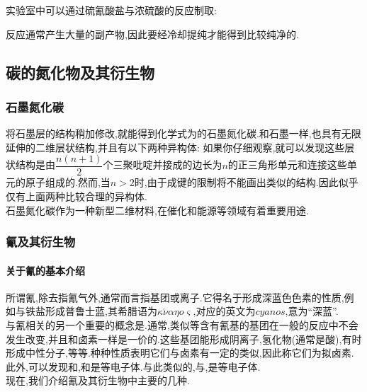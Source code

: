 \documentclass[draft]{ctexart}
\begin{document}
\indent 实验室中可以通过硫氰酸盐与浓硫酸的反应制取:
\begin{center}
\end{center}
反应通常产生大量的副产物,因此要经冷却提纯才能得到比较纯净的.
\subsection{碳的氮化物及其衍生物}
\subsubsection{石墨氮化碳}
将石墨层的结构稍加修改,就能得到化学式为的石墨氮化碳.和石墨一样,也具有无限延伸的二维层状结构,并且有以下两种异构体:
如果你仔细观察,就可以发现这些层状结构是由$\dfrac{n(n+1)}{2}$个三聚吡啶并接成的边长为$n$的正三角形单元和连接这些单元的原子组成的.然而,当$n>2$时,由于成键的限制将不能画出类似的结构.因此似乎仅有上面两种比较合理的异构体.\\
\indent 石墨氮化碳作为一种新型二维材料,在催化和能源等领域有着重要用途.
\subsubsection{氰及其衍生物}
\paragraph{关于氰的基本介绍}
所谓氰,除去指氰气外,通常而言指基团或离子.它得名于形成深蓝色色素的性质,例如与铁盐形成普鲁士蓝,其希腊语为$\kappa\acute{\nu}\alpha\eta o\varsigma$,对应的英文为$cyanos$,意为“深蓝”.\\
\indent 与氰相关的另一个重要的概念是.通常,类似等含有氰基的基团在一般的反应中不会发生改变,并且和卤素一样是一价的.这些基团能形成阴离子,氢化物(通常是酸),有时形成中性分子,等等.种种性质表明它们与卤素有一定的类似,因此称它们为拟卤素.\\
\indent 此外,可以发现和,和是等电子体.与此类似的,与,是等电子体.\\
\indent 现在,我们介绍氰及其衍生物中主要的几种.
\end{document}
